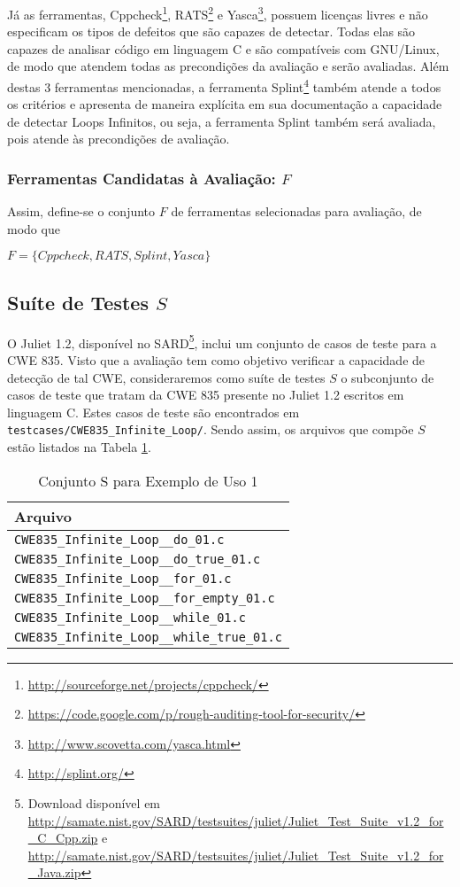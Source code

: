 Já as ferramentas, Cppcheck\footnote{\url{http://sourceforge.net/projects/cppcheck/}}, RATS\footnote{\url{https://code.google.com/p/rough-auditing-tool-for-security/}} e Yasca\footnote{\url{http://www.scovetta.com/yasca.html}}, possuem licenças livres e não especificam os tipos de defeitos que são capazes de detectar. Todas elas são capazes de analisar código em linguagem C e são compatíveis com GNU/Linux, de modo que atendem todas as precondições da avaliação e serão avaliadas. Além destas 3 ferramentas mencionadas, a ferramenta Splint\footnote{\url{http://splint.org/}} também atende a todos os critérios e apresenta de maneira explícita em sua documentação a capacidade de detectar Loops Infinitos, ou seja, a ferramenta Splint também será avaliada, pois atende às precondições de avaliação.

\subsubsection{Ferramentas Candidatas à Avaliação: $F$}

Assim, define-se o conjunto $F$ de ferramentas selecionadas para avaliação, de modo que

$F = \lbrace Cppcheck, RATS, Splint, Yasca\rbrace$

\subsection{Suíte de Testes $S$}

O Juliet 1.2, disponível no SARD\footnote{Download disponível em \url{http://samate.nist.gov/SARD/testsuites/juliet/Juliet_Test_Suite_v1.2_for_C_Cpp.zip} e \url{http://samate.nist.gov/SARD/testsuites/juliet/Juliet_Test_Suite_v1.2_for_Java.zip}}, inclui um conjunto de casos de teste para a CWE 835. Visto que a avaliação tem como objetivo verificar a capacidade de detecção de tal CWE, consideraremos como suíte de testes $S$ o subconjunto de casos de teste que tratam da CWE 835 presente no Juliet 1.2 escritos em linguagem C. Estes casos de teste são encontrados em \lstinline{testcases/CWE835_Infinite_Loop/}. Sendo assim, os arquivos que compõe $S$ estão listados na Tabela \ref{tabela_S_eu1}.

\begin{table}
\caption{Conjunto S para Exemplo de Uso 1}
  \centering
\begin{tabular}{l}
  \hline
  \textbf{Arquivo} \\ \hline
  \lstinline!CWE835_Infinite_Loop__do_01.c! \\ 
  \lstinline!CWE835_Infinite_Loop__do_true_01.c! \\ 
  \lstinline!CWE835_Infinite_Loop__for_01.c! \\ 
  \lstinline!CWE835_Infinite_Loop__for_empty_01.c! \\ 
  \lstinline!CWE835_Infinite_Loop__while_01.c! \\ 
  \lstinline!CWE835_Infinite_Loop__while_true_01.c! \\ \hline
\end{tabular}
\label{tabela_S_eu1}
\end{table}

